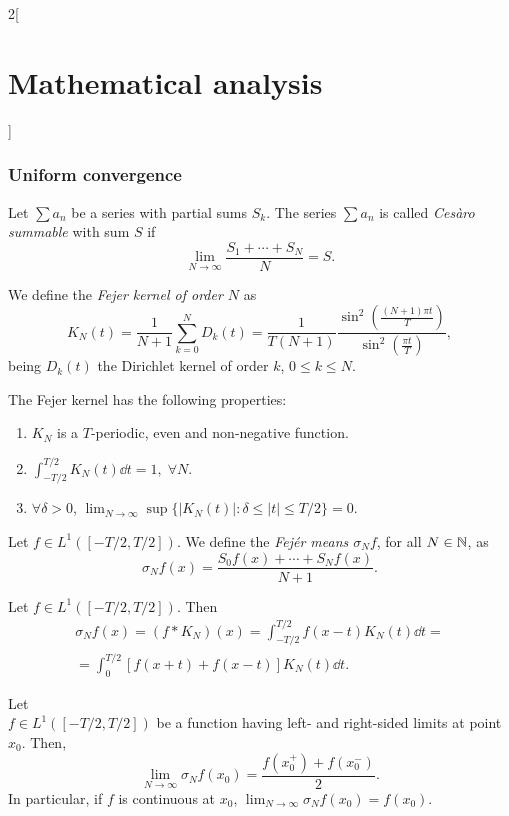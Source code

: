 \documentclass[../../../main.tex]{subfiles}
\begin{document}
\begin{multicols}{2}[\section{Mathematical analysis}]
  \subsubsection{Uniform convergence}
  \begin{definition}
    Let $\sum a_n$ be a series with partial sums $S_k$. The series $\sum a_n$ is called \textit{Cesàro summable} with sum $S$ if $$\lim_{N\to\infty}\frac{S_1+\cdots+S_N}{N}=S.$$
  \end{definition}
  \begin{definition}
    We define the \textit{Fejer kernel of order $N$} as $$K_N(t)=\frac{1}{N+1}\sum_{k=0}^ND_k(t)=\frac{1}{T(N+1)}\frac{\sin^2\left(\frac{(N+1)\pi t}{T}\right)}{\sin^2\left(\frac{\pi t}{T}\right)},$$ being $D_k(t)$ the Dirichlet kernel of order $k$, $0\leq k\leq N$.
  \end{definition}
  \begin{prop}
    The Fejer kernel has the following properties:
    \begin{enumerate}
      \item $K_N$ is a $T$-periodic, even and non-negative function.
      \item $\displaystyle\int_{-T/2}^{T/2}K_N(t)\dd t=1,\;\forall N$.
      \item $\forall\delta>0$, $\displaystyle\lim_{N\to\infty}\sup\{|K_N(t)|:\delta\leq|t|\leq T/2\}=0$.
    \end{enumerate}
  \end{prop}
  \begin{definition}
    Let $f\in L^1([-T/2,T/2])$. We define the \textit{Fejér means $\sigma_Nf$}, for all $N\in\mathbb{N} $, as $$\sigma_Nf(x)=\frac{S_0f(x)+\cdots+S_Nf(x)}{N+1}.$$
  \end{definition}
  \begin{prop}
    Let $f\in L^1([-T/2,T/2])$. Then \begin{multline*}\sigma_Nf(x)=(f*K_N)(x)=\int_{-T/2}^{T/2}f(x-t)K_N(t)\dd t=\\=\int_0^{T/2}[f(x+t)+f(x-t)]K_N(t)\dd t.\end{multline*}
  \end{prop}
  \begin{theorem}
    Let \\$f\in L^1([-T/2,T/2])$ be a function having left- and right-sided limits at point $x_0$. Then, $$\lim_{N\to\infty}\sigma_Nf(x_0)=\frac{f(x_0^+)+f(x_0^-)}{2}.$$ In particular, if $f$ is continuous at $x_0$, $\displaystyle\lim_{N\to\infty}\sigma_Nf(x_0)=f(x_0).$

\end{theorem}
\end{multicols}
\end{document}
